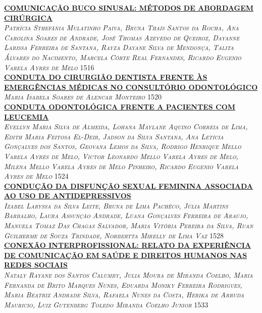 \noindent \textsc{\hyperlink{trabalhos/249905.pdf.1}{\textbf{COMUNICAÇÃO BUCO SINUSAL: MÉTODOS DE ABORDAGEM CIRÚRGICA}}}\\ 
\noindent \textsc{\textit{Patrícia Sthefânia Mulatinho Paiva, Bruna Thaís Santos da Rocha, Ana Carolina Soares de Andrade, José Thomas Azevedo de Queiroz, Dayanne Larissa Ferreira de Santana, Rayza Dayane Silva de Mendonça, Talita Álvares do Nacimento, Marcela Côrte Real Fernandes, Ricardo Eugenio Varela Ayres de Melo}} \hfill 1516\\ 

\noindent \textsc{\hyperlink{trabalhos/249945.pdf.1}{\textbf{CONDUTA DO CIRURGIÃO DENTISTA FRENTE ÀS EMERGÊNCIAS MÉDICAS NO CONSULTÓRIO ODONTOLÓGICO}}}\\ 
\noindent \textsc{\textit{Maria Isabela Soares de Alencar Monteiro}} \hfill 1520\\ 

\noindent \textsc{\hyperlink{trabalhos/251766.pdf.1}{\textbf{CONDUTA ODONTOLÓGICA FRENTE A PACIENTES COM LEUCEMIA}}}\\ 
\noindent \textsc{\textit{Evellyn Maria Silva de Almeida, Lohana Maylane Aquino Correia de Lima, Edith Maria Feitosa El-Deir, Jadson da Silva Santana, Ana Letícia Gonçalves dos Santos, Geovana Lemos da Silva, Rodrigo Henrique Mello Varela Ayres de Melo, Victor Leonardo Mello Varela Ayres de Melo, Milena Mello Varela Ayres de Melo Pinheiro, Ricardo Eugenio Varela Ayres de Melo}} \hfill 1524\\ 

\noindent \textsc{\hyperlink{trabalhos/251861.pdf.1}{\textbf{CONDUÇÃO DA DISFUNÇÃO SEXUAL FEMININA ASSOCIADA AO USO DE ANTIDEPRESSIVOS}}}\\ 
\noindent \textsc{\textit{Izabel Laryssa da Silva Leite, Bruna de Lima Pachêco, Júlia Martins Barbalho, Laura Assunção Andrade, Luana Gonçalves Ferreira de Araujo, Manuela Tomaz Das Chagas Salvador, Maria Vitória Pereira da Silva, Ruan Guilherme de Souza Trindade, Norbertta Mirelly de Lima Vaz}} \hfill 1528\\ 

\noindent \textsc{\hyperlink{trabalhos/250088.pdf.1}{\textbf{CONEXÃO INTERPROFISSIONAL: RELATO DA EXPERIÊNCIA DE COMUNICAÇÃO EM SAÚDE E DIREITOS HUMANOS NAS REDES SOCIAIS}}}\\ 
\noindent \textsc{\textit{Nataly Rayane dos Santos Calumby, Julia Moura de Miranda Coelho, Maria Fernanda de Brito Marques Nunes, Eduarda Moniky Ferreira Rodrigues, Maria Beatriz Andrade Silva, Rafaela Nunes da Costa, Herika de Arruda Mauricio, Luiz Gutenberg Toledo Miranda Coelho Junior}} \hfill 1533\\ 

